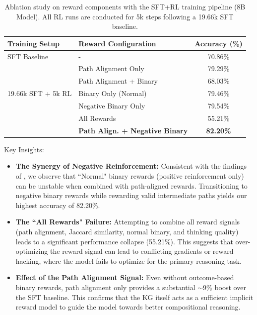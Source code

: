\documentclass{article}
\theoremstyle{plain}
\theoremstyle{definition}
\theoremstyle{remark}
\begin{document}
\begin{table}[ht]
\caption{Ablation study on reward components with the SFT+RL training pipeline (8B Model). All RL runs are conducted for 5k steps following a 19.66k SFT baseline.}
\label{tab:sft_rl_ablation}
\vskip 0.15in
\begin{center}
\begin{small}
\begin{sc}
\begin{tabular}{llc}
\toprule
Training Setup & Reward Configuration & Accuracy (\%) \\
\midrule
SFT Baseline  & - & 70.86\% \\
\midrule
\multirow{5}{*}{19.66k SFT + 5k RL} 
  & Path Alignment Only & 79.29\% \\
  & Path Alignment + Binary & 68.03\% \\
  & Binary Only (Normal) & 79.46\% \\
  & Negative Binary Only & 79.54\% \\
  & All Rewards & 55.21\% \\
  & \textbf{Path Align. + Negative Binary} & \textbf{82.20\%} \\
\bottomrule
\end{tabular}
\end{sc}
\end{small}
\end{center}
\vskip -0.1in
\end{table}

Key Insights:
\begin{itemize}
    \item \textbf{The Synergy of Negative Reinforcement:} Consistent with the findings of \cite{Zhu2025}, we observe that ``Normal" binary rewards (positive reinforcement only) can be unstable when combined with path-aligned rewards. Transitioning to negative binary rewards while rewarding valid intermediate paths yields our highest accuracy of 82.20\%.

    \item \textbf{The ``All Rewards" Failure:} Attempting to combine all reward signals (path alignment, Jaccard similarity, normal binary, and thinking quality) leads to a significant performance collapse (55.21\%). This suggests that over-optimizing the reward signal can lead to conflicting gradients or reward hacking, where the model fails to optimize for the primary reasoning task.

    \item \textbf{Effect of the Path Alignment Signal:} Even without outcome-based binary rewards, path alignment only provides a substantial $\sim$9\% boost over the SFT baseline. This confirms that the KG itself acts as a sufficient implicit reward model to guide the model towards better compositional reasoning.
    
\end{itemize}
\end{document}

